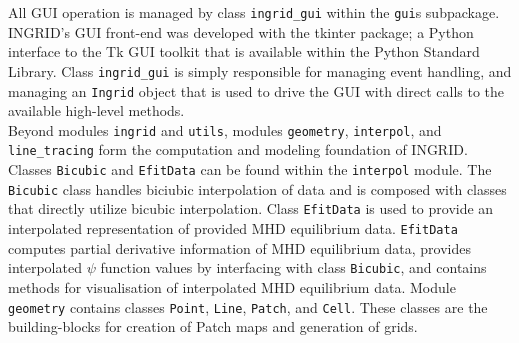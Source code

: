 All GUI operation is managed by class \texttt{ingrid\_gui} within the \texttt{gui}s subpackage. INGRID's GUI front-end was developed with the tkinter package; a Python interface to the Tk GUI toolkit that is available within the Python Standard Library. Class \texttt{ingrid\_gui} is simply responsible for managing event handling, and managing an \texttt{Ingrid} object that is used to drive the GUI with direct calls to the available high-level methods.\\ \indent
Beyond modules \texttt{ingrid} and \texttt{utils}, modules \texttt{geometry}, \texttt{interpol}, and \texttt{line\_tracing} form the computation and modeling foundation of INGRID. Classes \texttt{Bicubic} and \texttt{EfitData} can be found within the \texttt{interpol} module. The \texttt{Bicubic} class handles biciubic interpolation of data and is composed with classes that directly utilize bicubic interpolation. Class \texttt{EfitData} is used to provide an interpolated representation of provided MHD equilibrium data. \texttt{EfitData} computes partial derivative information of MHD equilibrium data, provides interpolated $\psi$ function values by interfacing with class \texttt{Bicubic}, and contains methods for visualisation of interpolated MHD equilibrium data. Module \texttt{geometry} contains classes \texttt{Point}, \texttt{Line}, \texttt{Patch}, and \texttt{Cell}. These classes are the building-blocks for creation of Patch maps and generation of grids.